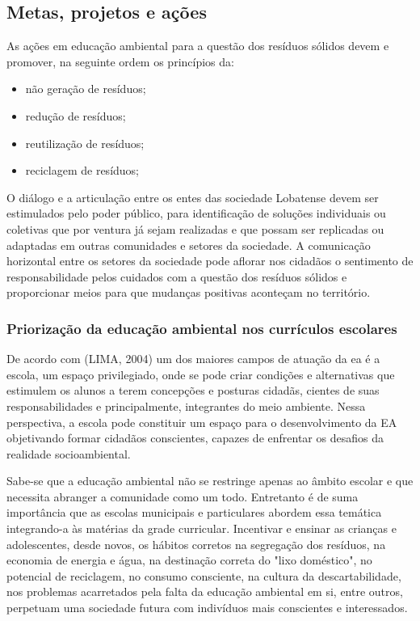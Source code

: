 \subsection{Metas, projetos e ações}

As ações em educação ambiental para a questão dos resíduos sólidos devem e promover, na seguinte ordem os princípios da:
\begin{itemize}
	\item não geração de resíduos;
	\item redução de resíduos;
	\item reutilização de resíduos;
	\item reciclagem de resíduos;
\end{itemize} 

O diálogo e a articulação entre os entes das sociedade Lobatense devem ser estimulados pelo poder público, para identificação de soluções individuais ou coletivas que por ventura já sejam realizadas e que possam ser replicadas ou adaptadas em outras comunidades e setores da sociedade. A comunicação horizontal entre os setores da sociedade pode aflorar nos cidadãos o sentimento de responsabilidade pelos cuidados com a questão dos resíduos sólidos e proporcionar meios para que mudanças positivas aconteçam no território.

\subsubsection{Priorização da educação ambiental nos currículos escolares}
De acordo com (LIMA, 2004) um dos maiores campos de atuação da \gls{ea} é a escola, um espaço privilegiado, onde se pode criar condições e alternativas que estimulem os alunos a terem concepções e posturas cidadãs, cientes de suas responsabilidades e principalmente, integrantes do meio ambiente. Nessa perspectiva, a escola pode constituir um espaço para o desenvolvimento da EA objetivando formar cidadãos conscientes, capazes de enfrentar os desafios da realidade socioambiental.

Sabe-se que a educação ambiental não se restringe apenas ao âmbito escolar e que necessita abranger a comunidade como um todo. Entretanto é de suma importância que as escolas municipais e particulares abordem essa temática integrando-a às matérias da grade curricular. Incentivar e ensinar as crianças e adolescentes, desde novos, os hábitos corretos na segregação dos resíduos, na economia de energia e água, na destinação correta do "lixo doméstico", no potencial de reciclagem, no consumo consciente, na cultura da descartabilidade, nos problemas acarretados pela falta da educação ambiental em si, entre outros, perpetuam uma sociedade futura com indivíduos mais conscientes e interessados.

